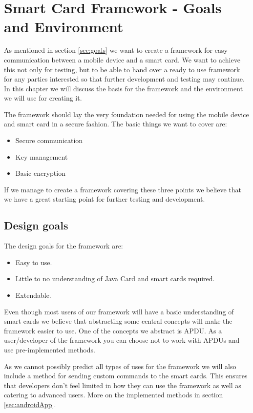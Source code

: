\chapter{Smart Card Framework - Goals and Environment}
As mentioned in section \ref{sec:goals} we want to create a framework for easy communication between a mobile device and a smart card. We want to achieve this not only for testing, but to be able to hand over a ready to use framework for any parties interested so that further development and testing may continue. In this chapter we will discuss the basis for the framework and the environment we will use for creating it.

The framework should lay the very foundation needed for using the mobile device and smart card in a secure fashion. The basic things we want to cover are:
\begin{itemize}
    \item Secure communication
    \item Key management
    \item Basic encryption
\end{itemize}
If we manage to create a framework covering these three points we believe that we have a great starting point for further testing and development.

\section{Design goals}
\label{sec:designAndroidGoals}
The design goals for the framework are:

\begin{itemize}
    \item Easy to use.
    \item Little to no understanding of Java Card and smart cards required.
    \item Extendable.
\end{itemize}

Even though most users of our framework will have a basic understanding of smart cards we believe that abstracting some central concepts will make the framework easier to use. One of the concepts we abstract is APDU. As a user/developer of the framework you can choose not to work with APDUs and use pre-implemented methods.

As we cannot possibly predict all types of uses for the framework we will also include a method for sending custom commands to the smart cards. This ensures that developers don't feel limited in how they can use the framework as well as catering to advanced users. More on the implemented methods in section \ref{sec:androidApp}.

